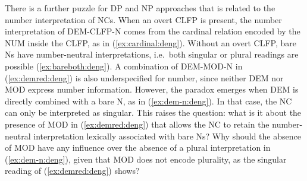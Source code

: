 \documentclass[output=paper,colorlinks,citecolor=brown]{langscibook}
\begin{document}
There is a further puzzle for DP and NP approaches that is related to the number interpretation of NCs.  
%
When an overt CLFP is present, the number interpretation of DEM-CLFP-N comes from the cardinal relation encoded by the NUM inside the CLFP, as in (\ref{ex:cardinal:deng}). %
Without an overt CLFP, bare Ns have number-neutral interpretations, i.e.\ both singular or plural readings are possible (\ref{ex:bareboth:deng}). 
%
A combination of DEM-MOD-N in (\ref{ex:demred:deng}) is also underspecified for number, since neither DEM nor MOD express number information. %
%
However, the paradox emerges when DEM is directly combined with a bare N, as in (\ref{ex:dem-n:deng}). In that case, the NC can only be interpreted as singular. This raises the question: what is it about the presence  of MOD in (\ref{ex:demred:deng}) that allows the NC to retain the number-neutral interpretation lexically associated with bare Ns? Why should the absence of MOD have any influence over the absence of a plural interpretation in (\ref{ex:dem-n:deng}), given that MOD does not encode plurality, as the singular reading of (\ref{ex:demred:deng})  shows?%


\ea \label{ex:sing-dem-para:deng}



\z\z 
\end{document}
